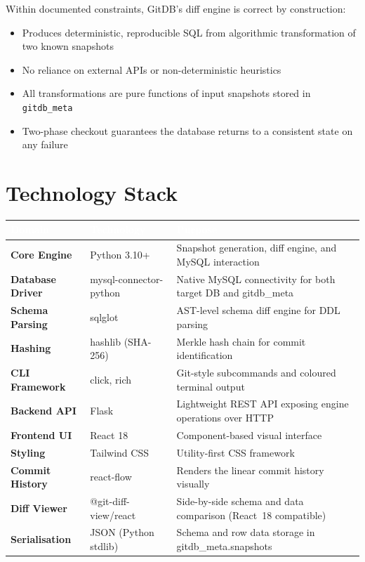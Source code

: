 \documentclass[12pt, a4paper]{article}
\begin{document}
Within documented constraints, GitDB's diff engine is correct by construction:

\begin{itemize}[leftmargin=1.5em, itemsep=0.3em]
    \item Produces deterministic, reproducible SQL from algorithmic
    transformation of two known snapshots
    \item No reliance on external APIs or non-deterministic heuristics
    \item All transformations are pure functions of input snapshots stored in
    \texttt{gitdb\_meta}
    \item Two-phase checkout guarantees the database returns to a consistent
    state on any failure
\end{itemize}

\section{Technology Stack}

\renewcommand{\arraystretch}{1.4}
\begin{tabularx}{\textwidth}{>{\bfseries}p{3.2cm} >{\ttfamily}p{3.8cm} X}
\rowcolor{tableheader}
\textcolor{white}{\normalfont\bfseries Domain} &
\textcolor{white}{\normalfont\bfseries Technology} &
\textcolor{white}{\normalfont\bfseries Purpose} \\
\midrule
Core Engine       & Python 3.10+           & Snapshot generation, diff engine, and MySQL interaction \\
\rowcolor{lightgray}
Database Driver   & mysql-connector-python & Native MySQL connectivity for both target DB and gitdb\_meta \\
Schema Parsing    & sqlglot                & AST-level schema diff engine for DDL parsing \\
\rowcolor{lightgray}
Hashing           & hashlib (SHA-256)      & Merkle hash chain for commit identification \\
CLI Framework     & click, rich            & Git-style subcommands and coloured terminal output \\
\rowcolor{lightgray}
Backend API       & Flask                  & Lightweight REST API exposing engine operations over HTTP \\
Frontend UI       & React 18               & Component-based visual interface \\
\rowcolor{lightgray}
Styling           & Tailwind CSS           & Utility-first CSS framework \\
Commit History    & react-flow             & Renders the linear commit history visually \\
\rowcolor{lightgray}
Diff Viewer       & @git-diff-view/react   & Side-by-side schema and data comparison (React~18 compatible) \\
Serialisation     & JSON (Python stdlib)   & Schema and row data storage in gitdb\_meta.snapshots \\
\end{tabularx}
\end{document}
